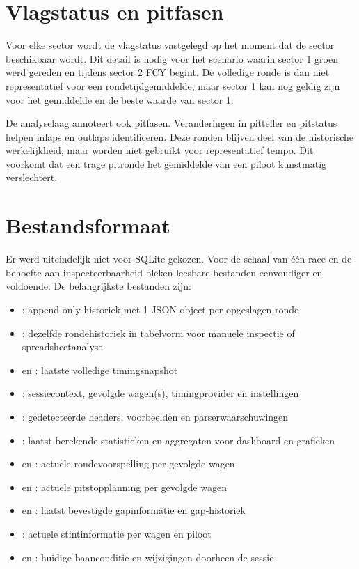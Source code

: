 \section{Vlagstatus en pitfasen}
Voor elke sector wordt de vlagstatus vastgelegd op het moment dat de sector beschikbaar wordt. Dit
detail is nodig voor het scenario waarin sector 1 groen werd gereden en tijdens sector 2 FCY
begint. De volledige ronde is dan niet representatief voor een rondetijdgemiddelde, maar sector 1
kan nog geldig zijn voor het gemiddelde en de beste waarde van sector 1.

De analyselaag annoteert ook pitfasen. Veranderingen in pitteller en pitstatus helpen inlaps en
outlaps identificeren. Deze ronden blijven deel van de historische werkelijkheid, maar worden niet
gebruikt voor representatief tempo. Dit voorkomt dat een trage pitronde het gemiddelde van een
piloot kunstmatig verslechtert.

\section{Bestandsformaat}
Er werd uiteindelijk niet voor SQLite gekozen. Voor de schaal van één race en de behoefte aan
inspecteerbaarheid bleken leesbare bestanden eenvoudiger en voldoende. De belangrijkste bestanden
zijn:

\begin{itemize}
  \item {}: append-only historiek met 1 JSON-object per opgeslagen ronde
  \item {}: dezelfde rondehistoriek in tabelvorm voor manuele inspectie of spreadsheetanalyse
  \item {} en : laatste volledige timingsnapshot
  \item {}: sessiecontext, gevolgde wagen(s), timingprovider en instellingen
  \item {}: gedetecteerde headers, voorbeelden en parserwaarschuwingen
  \item {}: laatst berekende statistieken en aggregaten voor dashboard en grafieken
  \item {} en : actuele rondevoorspelling per gevolgde wagen
  \item {} en : actuele pitstopplanning per gevolgde wagen
  \item {} en : laatst bevestigde gapinformatie en gap-historiek
  \item {}: actuele stintinformatie per wagen en piloot
  \item {} en : huidige baanconditie en wijzigingen doorheen de sessie
\end{itemize}

